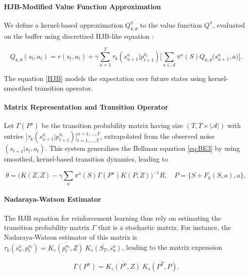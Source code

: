 \documentclass[
]{article}
\numberwithin{equation}{section}
\begin{document}
\paragraph*{HJB-Modified Value Function Approximation} We define a kernel-based approximation $Q_{k,\theta}^\pi$ to the value function $Q^\pi$, evaluated on the buffer using discretized HJB-like equation :

\begin{equation}\label{HJB}
Q_{k,\theta}(s_t,a_t) = r(s_t,a_t) +  \gamma  \sum_{u=1}^T  \tau_k( s_{u+1}^{a} | p_{t+1}^{a_t} ) \Big[ \sum_{a \in \mathcal{A}} \pi^a(S) Q_{k,\theta}\big(s_{u+1}^a,a\big)\Big].
\end{equation}

The equation \eqref{HJB} models the expectation over future states using kernel-smoothed transition operator. 

\paragraph*{Matrix Representation and Transition Operator} Let $\Gamma(P^a)$ be the transition probability matrix having size $(T,T \times |\mathcal{A} |)$ with entries $\Big[ \tau_k( s_{u+1}^{a} | p_{t+1}^{a_t} ) \Big]_{t=1,\ldots,T}^{u=1,\ldots,T}$, extrapolated from the observed noise $(s_{t+1} | s_t, a_t)$. This system generalizes the Bellman equation \eqref{eq:BE3} by using smoothed, kernel-based transition dynamics, leading to
 
\begin{equation}\label{HJBMAT}
\theta = \Big( K(Z, Z) - \gamma \sum_{a} \pi^a(S)\Gamma(P^a) K(P, Z)\Big)^{-1} R, \quad P = \{ S+F_k(S,a), a \},
\end{equation} 

\paragraph*{Nadaraya-Watson Estimator} The HJB equation for reinforcement learning thus rely on estimating the transition probability matrix $\Gamma$ that is a stochastic matrix. For instance, the Nadaraya-Watson estimator of this matrix is 
$\tau_k( s_u^{a} , p_t^{a_t} )=\overline{K_z(p_t^{a_t},Z)}\ \overline{K_s(S_{T},s_u^a)}$, leading to the matrix expression

\begin{equation}\label{NW}
\Gamma(P^a) = \overline{K_z(P^a,Z)} \  \overline{K_s(P^T,P)}.
\end{equation}
\end{document}
